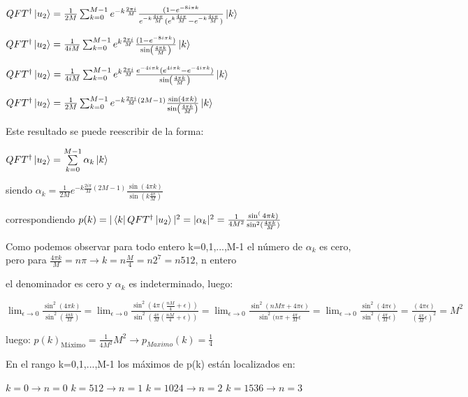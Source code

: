 $QFT^\dagger \ket{u_2} = \frac{1}{2M} \sum_{k=0}^{M-1} e^{-k \frac{2 \pi i}{M}} \frac{(1 - e^{-8 i \pi k}}{e^{-k \frac{4 i \pi}{M}} (e^{k \frac{4 i \pi}{M}} - e^{-k \frac{4 i \pi}{M}})} \ket{k}$

$QFT^\dagger \ket{u_2} = \frac{1}{4 i M} \sum_{k=0}^{M-1} e^{k \frac{2 \pi i}{M}} \frac{(1 - e^{-8 i \pi k})}{\sin(\frac{4\pi k}{M})} \ket{k}$

$QFT^\dagger \ket{u_2} = \frac{1}{4 i M} \sum_{k=0}^{M-1} e^{k \frac{2 \pi i}{M}} \frac{e^{-4 i \pi k} (e^{4 i \pi k} - e^{-4 i \pi k})}{\sin(\frac{4\pi k}{M})} \ket{k}$

$QFT^\dagger \ket{u_2} = \frac{1}{2M} \sum_{k=0}^{M-1} e^{-k \frac{2 \pi i}{M} (2M-1)} \frac{\sin(4\pi k)}{\sin(\frac{4\pi k}{M})} \ket{k}$

Este resultado se puede reescribir de la forma:

$QFT^\dagger \ket{u_2} = \sum\limits_{k=0}^{M-1} \alpha_k \ket{k}$

siendo $\alpha_k = \frac{1}{2M} e^{-k \frac{2 i \pi}{M} (2M-1)} \frac{\sin(4 \pi k)}{\sin(k \frac{4 \pi}{M})}$

correspondiendo $p(k) = |\bra{k} QFT^\dagger \ket{u_2}|^2 = |\alpha_k|^2 = \frac{1}{4M^2} \frac{\sin^(4\pi k)}{\sin^2(\frac{4 \pi k}{M})}$

Como podemos observar para todo entero k=0,1,...,M-1 el número de $\alpha_k$ es cero, pero para $\frac{4 \pi k}{M} = n \pi \rightarrow k = n \frac{M}{4} = n 2^7 = n 512$, n entero

el denominador es cero y $\alpha_k$ es indeterminado, luego:

$\lim_{\epsilon \to 0} \frac{\sin^2(4 \pi k)}{\sin^2(\frac{4\pi k}{M})} = \lim_{\epsilon \to 0} \frac{\sin^2(4 \pi (\frac{n M}{4} + \epsilon))}{\sin^2(\frac{4\pi}{M} (\frac{n M}{4} + \epsilon))} = \lim_{\epsilon \to 0} \frac{\sin^2(n M \pi + 4 \pi \epsilon)}{\sin^2(n \pi + \frac{4\pi}{M} \epsilon} = \lim_{\epsilon \to 0} \frac{\sin^2(4 \pi \epsilon)}{\sin^2(\frac{4 \pi}{M} \epsilon)} = \frac{(4 \pi \epsilon)}{(\frac{4 \pi}{M} \epsilon)^2} = M^2$

luego: $p(k)_{\text{Máximo}} = \frac{1}{4M^2} M^2 \rightarrow p_{Maximo}(k) = \frac{1}{4}$

En el rango k=0,1,...,M-1 los máximos de p(k) están localizados en:

$k=0 \rightarrow n=0$
$k=512 \rightarrow n=1$
$k=1024 \rightarrow n=2$
$k=1536 \rightarrow n=3$


